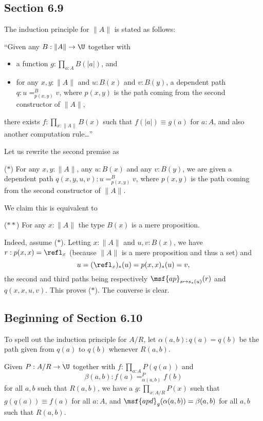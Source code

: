 \documentclass[12pt]{article}
\begin{document}

\subsection{Section 6.9}

The induction principle for $\lVert A\rVert$ is stated as follows:

\nn``Given any $B:\lVert A\rVert\to\U$ together with
\begin{itemize}
\item a function $g:\prod_{a:A}B(\lvert a\rvert)$, and
\item for any $x,y:\lVert A\rVert$ and $u:B(x)$ and $v:B(y)$, a dependent path $q:u=^B_{p(x,y)}v$, where $p(x,y)$ is the path coming from the second constructor of $\lVert A\rVert$,
\end{itemize}
there exists $f:\prod_{x:\lVert A\rVert}B(x)$ such that $f(\lvert a\rvert)\equiv g(a)$ for $a:A$, and also another computation rule\dots''

Let us rewrite the second premise as

\nn($*$) For any $x,y:\lVert A\rVert$, any $u:B(x)$ and any $v:B(y)$, we are given a dependent path $q(x,y,u,v):u=^B_{p(x,y)}v$, where $p(x,y)$ is the path coming from the second constructor of $\lVert A\rVert$.

We claim this is equivalent to 

\nn($**$) For any $x:\lVert A\rVert$ the type $B(x)$ is a mere proposition.

Indeed, assume ($*$). Letting $x:\lVert A\rVert$ and $u,v:B(x)$, we have $r:p(x,x)=\refl_x$ (because $\lVert A\rVert$ is a mere proposition and thus a set) and 
$$
u=(\refl_x)_*(u)=p(x,x)_*(u)=v,
$$ 
the second and third paths being respectively $\msf{ap}_{s\mapsto s_*(u)}(r)$ and $q(x,x,u,v)$. This proves ($*$). The converse is clear.


\subsection{Beginning of Section 6.10}

To spell out the induction principle for $A/R$, let $\alpha(a,b):q(a)=q(b)$ be the path given from $q(a)$ to $q(b)$ whenever $R(a,b)$. 

Given $P:A/R\to\U$ together with $f:\prod_{a:A}P(q(a))$ and 
$$
\beta(a,b):f(a)=^P_{\alpha(a,b)}f(b)
$$ 
for all $a,b$ such that $R(a,b)$, we have a $g:\prod_{x:A/R}P(x)$ such that $g(q(a))\equiv f(a)$ for all $a:A$, and $\msf{apd}_g(\alpha(a,b))=\beta(a,b)$ for all $a,b$ such that $R(a,b)$.
\end{document}
